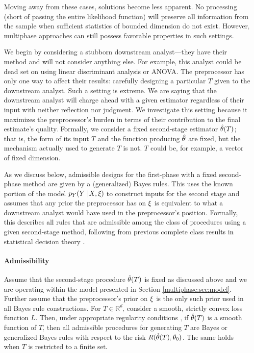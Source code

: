 Moving away from these cases, solutions become less apparent.
No processing (short of passing the entire likelihood function) will preserve all information from the sample when sufficient statistics of bounded dimension do not exist.
However, multiphase approaches can still possess favorable properties in such settings.

We begin by considering a stubborn downstream analyst---they have their method and will not consider anything else.
For example, this analyst could be dead set on using linear discriminant analysis or ANOVA.
The preprocessor has only one way to affect their results: carefully designing a particular $T$ given to the downstream analyst.
Such a setting is extreme.
We are saying that the downstream analyst will charge ahead with a given estimator regardless of their input with neither reflection nor judgment.
We investigate this setting because it maximizes the preprocessor's burden in terms of their contribution to the final estimate's quality.
Formally, we consider a fixed second-stage estimator $\hat{\theta}(T)$; that is, the form of its input $T$ and the function producing $\hat{\theta}$ are fixed, but the mechanism actually used to generate $T$ is not.
$T$ could be, for example, a vector of fixed dimension.

As we discuss below, admissible designs for the first-phase with a fixed second-phase method are given by a (generalized) Bayes rules.
This uses the known portion of the model $p_Y(Y \, | \, X, \xi)$ to construct inputs for the second stage and assumes that any prior the preprocessor has on $\xi$ is equivalent to what a downstream analyst  would have used in the preprocessor's position.
Formally, this describes all rules that are admissible among the class of procedures using a given second-stage method, following from previous complete class results in statistical decision theory \citep[e.g.][]{Berger1985,Farrell1968}.

\paragraph{Admissibility}
Assume that the second-stage procedure $\hat{\theta}(T)$ is fixed as discussed above and we are operating within the model presented in Section \ref{multiphase:sec:model}.
Further assume that the preprocessor's prior on $\xi$ is the only such prior used in all Bayes rule constructions.
For $T \in \mathbb{R}^d$, consider a smooth, strictly convex loss function $L$.
Then, under appropriate regularity conditions \citep[e.g.][]{Berger1985,Farrell1968}, if $\hat{\theta}(T)$ is a smooth function of $T$, then all admissible procedures for generating $T$ are Bayes or generalized Bayes rules with respect to the risk $R(\hat{\theta}(T), \theta_0)$.
The same holds when $T$ is restricted to a finite set.\\

